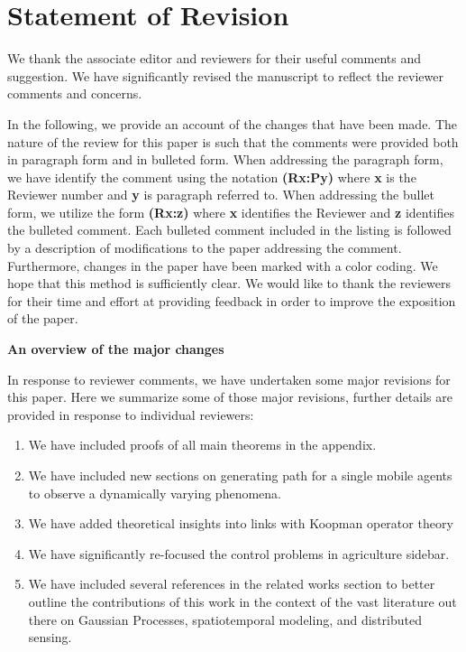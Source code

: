 \documentclass{letter}
\begin{document}
\section{Statement of Revision}

We thank the associate editor and reviewers for their useful comments and suggestion. We have significantly revised the manuscript to reflect the reviewer comments and concerns.

In the following, we provide an account of the changes that have been made.  The nature of
the review for this paper is such that the comments were provided both
in paragraph form and in bulleted form.  When addressing the paragraph
form, we have identify the comment using the notation {\bf {\color{red}(Rx:Py)}} where 
{\bf x} is the Reviewer number and {\bf y} is paragraph referred to.
When addressing the bullet form, we utilize the form {\bf (Rx:z)} where
{\bf x} identifies the Reviewer and {\bf z} identifies the bulleted comment.
Each bulleted comment included in the listing is followed by a description
of modifications to the paper addressing the comment. Furthermore, changes in the paper have been marked with a color coding.  We hope that this
method is sufficiently clear.
We would like to thank the reviewers for their time and effort at providing
feedback in order to improve the exposition of the paper.

\noindent\textbf{An overview of the major changes}

In response to reviewer comments, we have undertaken some major revisions for this paper. Here we summarize some of those major revisions, further details are provided in response to individual reviewers:

\begin{enumerate}
\item We have included proofs of all main theorems in the appendix.
\item We have included new sections on generating path for a single mobile agents to observe a dynamically varying phenomena.
\item We have added theoretical insights into links with Koopman operator theory
\item We have significantly re-focused the control problems in agriculture sidebar.
\item We have included several references in the related works section to better outline the contributions of this work in the context of the vast literature out there on Gaussian Processes, spatiotemporal modeling, and distributed sensing.
\end{enumerate}
\end{document}
